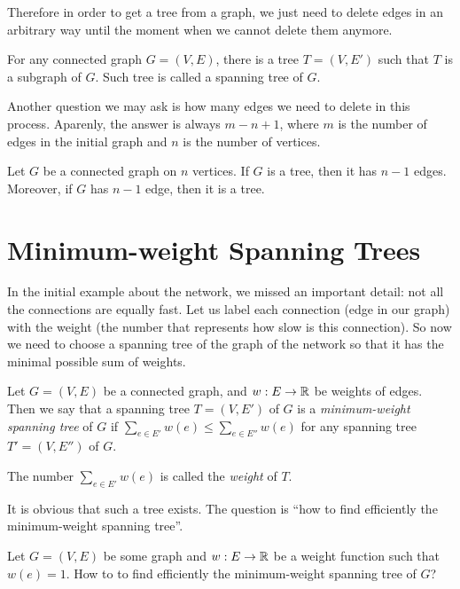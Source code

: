 Therefore in order to get a tree from a graph, we just need to delete edges
in an arbitrary way until the moment when we cannot delete them anymore.
\begin{corollary}
  For any connected graph $G = (V, E)$, there is a tree $T = (V, E')$ such
  that $T$ is a subgraph of $G$. Such tree is called a spanning tree of $G$.
\end{corollary}

Another question we may ask is how many edges we need to delete in this process.
Aparenly, the answer is always $m - n + 1$, where $m$ is the number of edges in
the initial graph and $n$ is the number of vertices.
\begin{theorem}
  Let $G$ be a connected graph on $n$ vertices.
  If $G$ is a tree, then it has $n - 1$ edges. Moreover, if $G$ has $n - 1$
  edge, then it is a tree.
\end{theorem}

\section{Minimum-weight Spanning Trees}
In the initial example about the network, we missed an important detail: not
all the connections are equally fast. Let us label each connection
(edge in our graph) with the weight (the number that represents how slow is this
connection). So now we need to choose a spanning tree of
the graph of the network so that it has the minimal possible sum of weights.
\begin{definition}
  Let $G = (V, E)$ be a connected graph, and $w : E \to \mathbb{R}$ be weights of edges.
  Then we say that a spanning tree $T = (V, E')$ of $G$ is a
  \emph{minimum-weight spanning tree} of $G$ if
  $\sum_{e \in E'} w(e) \le \sum_{e \in E''} w(e)$ for any spanning tree
  $T' = (V, E'')$ of $G$.

  The number $\sum_{e \in E'} w(e)$ is called the \emph{weight} of $T$.
\end{definition}

It is obvious that such a tree exists. The question is
``how to find efficiently the minimum-weight spanning tree''.
\begin{exercise}
  Let $G = (V, E)$ be some graph and $w : E \to \mathbb{R}$ be a weight function such
  that $w(e) = 1$. How to to find efficiently the minimum-weight spanning tree
  of $G$?
\end{exercise}


